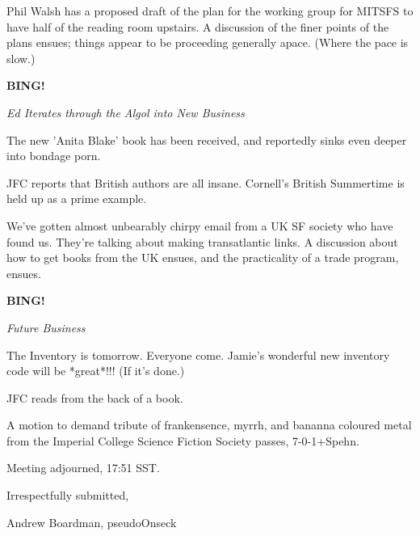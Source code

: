 \documentclass[12pt]{article}
\newcommand{\bing}{{\bf BING!} }
\newcommand{\goto}[1]{\bing \vskip 12pt \centerline{{\em{#1}}}}
\begin{document}
Phil Walsh has a proposed draft of the plan for the working group for
MITSFS to have half of the reading room upstairs.  A discussion of the
finer points of the plans ensues; things appear to be proceeding
generally apace.  (Where the pace is slow.)

\vspace{24pt}

\goto{Ed Iterates through the Algol into New Business}

The new 'Anita Blake' book has been received, and reportedly sinks even
deeper into bondage porn.

JFC reports that British authors are all insane.  Cornell's British
Summertime is held up as a prime example.

We've gotten almost unbearably chirpy email from a UK SF society who have
found us.  They're talking about making transatlantic links.  A
discussion about how to get books from the UK ensues, and the
practicality of a trade program, ensues.


\vspace{12pt}

\goto{Future Business}

The Inventory is tomorrow.  Everyone come.  Jamie's wonderful new
inventory code will be *great*!!!  (If it's done.)

JFC reads from the back of a book.

A motion to demand tribute of frankensence, myrrh, and bananna coloured
metal from the Imperial College Science Fiction Society passes,
\hbox{7-0-1+Spehn}.

\vspace{12pt}

\noindent
Meeting adjourned, 17:51 SST.

\vspace{18pt}

\centerline{Irrespectfully submitted,}
\centerline{Andrew Boardman, pseudoOnseck}
\end{document}
